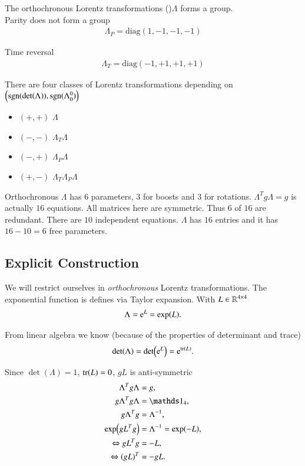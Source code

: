 The orthochronous Lorentz transformations ()$\Lambda$ forms a group. \\

Parity does not form a group
      \begin{align}
         \Lambda_P = \text{diag}(1,-1,-1,-1)
      \end{align}

Time reversal 
\begin{align}
   \Lambda_T = \text{diag}(-1,+1,+1,+1)
\end{align}

There are four classes of Lorentz transformations depending on $\left(\text{sgn}(\det(\Lambda)), \text{sgn}(\Lambda^0_0) \right)$
\begin{itemize}
   \item $(+, +)$ $\Lambda$
   \item $(- ,-)$ $\Lambda_T \Lambda$ 
   \item $(-, +)$ $\Lambda_P \Lambda$
   \item $(+, -)$ $\Lambda_T\Lambda_P \Lambda$
\end{itemize}

Orthochronous $\Lambda$ has 6 parameters, $3$ for boosts and $3$ for rotations. $\Lambda^T g \Lambda = g$ is actually $16$ equations. All matrices here are symmetric. Thus $6$ of $16$ are redundant. There are $10$ independent equations.
$\Lambda$ has $16$ entries and it has $16-10=6$ free parameters.

\subsection{Explicit Construction}
We will restrict ourselves in \textit{orthochronous} Lorentz transformations. The exponential function is defines via Taylor expansion. With $L \in \mathbb{R}^{4 \times 4}$
\begin{align*}
   \Lambda = \mathrm{e}^L = \exp(L).
\end{align*}

From linear algebra we know (because of the properties of determinant and trace)
\begin{align}
   \det(\Lambda) = \det(\mathrm{e}^L) = \mathrm{e}^{\tr(L)}.
\end{align}

Since $\det(\Lambda) = 1$, $\tr(L) = 0$,
$gL$ is anti-symmetric
\begin{align*}
   \Lambda^T g \Lambda &= g, \\
   g \Lambda^T g \Lambda &= \id_4, \\
   g \Lambda^T g &= \Lambda^{-1}, \\
   \exp(g L^T g) &= \Lambda^{-1} = \exp(-L), \\
   \Leftrightarrow g L^T g &= -L, \\
   \Leftrightarrow (gL)^T &= - gL.
\end{align*}

